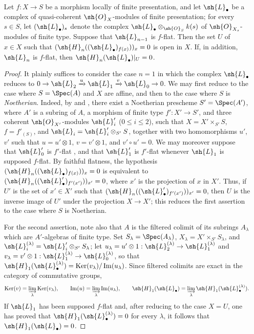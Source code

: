 \begin{proposition}[12.3.3]
\label{IV.12.3.3}
Let $f:X\to S$ be a morphism locally of finite presentation, and let $\sh{L}_\bullet$ be a complex of quasi-coherent $\sh{O}_X$-modules of finite presentation; for every $s\in S$, let $(\sh{L}_\bullet)_s$ denote the complex $\sh{L}_\bullet\otimes_{\sh{O}_S}k(s)$ of $\sh{O}_{X_s}$-modules of finite type.
Suppose that $\sh{L}_{n-1}$ is $f$-flat.
Then the set $U$ of $x\in X$ such that $(\sh{H}_n((\sh{L}_\bullet)_{f(x)}))_x=0$ is open in $X$.
If, in addition, $\sh{L}_n$ is $f$-flat, then $\sh{H}_n(\sh{L}_\bullet)|_U=0$.
\end{proposition}

\begin{proof}
It plainly suffices to consider the case $n=1$ in which the complex $\sh{L}_\bullet$ reduces to
$0\to\sh{L}_2\xrightarrow{u}\sh{L}_1\xrightarrow{v}\sh{L}_0\to 0$.
We may first reduce to the case where $S=\Spec(A)$ and $X$
are affine, and then to the case where $S$ is \emph{Noetherian}. Indeed, by  and , there exist a Noetherian prescheme $S'=\Spec(A')$, where $A'$ is a subring of $A$, a morphism of finite type $f':X'\to S'$, and three coherent $\sh{O}_{X'}$-modules $\sh{L}'_i$ ($0\leqslant i\leqslant 2$), such that
$X=X'\times_{S'}S$, $f=f'_{(S)}$, and $\sh{L}_i=\sh{L}'_i\otimes_{S'}S$, together with two homomorphisms $u'$, $v'$ such that $u=u'\otimes 1$, $v=v'\otimes 1$, and $v'\circ u'=0$.
We may moreover suppose that $\sh{L}'_0$ is $f'$-flat , and that $\sh{L}'_1$ is $f'$-flat whenever $\sh{L}_1$ is supposed $f$-flat.
By faithful flatness, the hypothesis
$(\sh{H}_n((\sh{L}_\bullet)_{f(x)}))_x=0$
is equivalent to
$(\sh{H}_n((\sh{L}'_\bullet)_{f'(x')}))_{x'}=0$,
where $x'$ is the projection of $x$ in $X'$.
Thus, if $U'$ is the set of $x'\in X'$ such that
$(\sh{H}_n((\sh{L}'_\bullet)_{f'(x')}))_{x'}=0$,
then $U$ is the inverse image of $U'$ under the projection $X\to X'$; this reduces the first assertion to the case where $S$ is Noetherian.

For the second assertion, note also that $A$ is the filtered colimit of its subrings $A_\lambda$ which are $A'$-algebras of finite type.
Set $S_\lambda=\Spec(A_\lambda)$,
$X_\lambda=X'\times_{S'}S_\lambda$, and
$\sh{L}^{(\lambda)}_i=\sh{L}'_i\otimes_{S'}S_\lambda$; let
$u_\lambda=u'\otimes 1:\sh{L}_2^{(\lambda)}\to\sh{L}_1^{(\lambda)}$ and
$v_\lambda=v'\otimes 1:\sh{L}_1^{(\lambda)}\to\sh{L}_0^{(\lambda)}$, so that
$\sh{H}_1(\sh{L}_\bullet^{(\lambda)})=\operatorname{Ker}(v_\lambda)/\operatorname{Im}(u_\lambda)$.
Since filtered colimits are exact in the category of commutative groups,
\[
  \operatorname{Ker}(v)=\varinjlim_\lambda\operatorname{Ker}(v_\lambda),\qquad
  \operatorname{Im}(u)=\varinjlim_\lambda\operatorname{Im}(u_\lambda),\qquad
  \sh{H}_1(\sh{L}_\bullet)=\varinjlim_\lambda\sh{H}_1(\sh{L}_\bullet^{(\lambda)}).
\]
If $\sh{L}_1$ has been supposed $f$-flat and, after reducing to the case $X=U$, one has proved that
$\sh{H}_1(\sh{L}_\bullet^{(\lambda)})=0$ for every $\lambda$, it follows that
$\sh{H}_1(\sh{L}_\bullet)=0$.


\end{proof}
